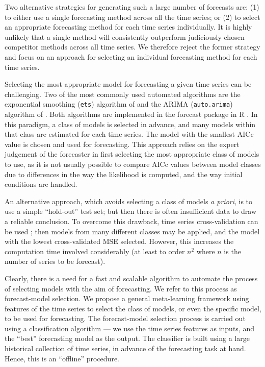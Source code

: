 \documentclass[11pt,a4paper,]{article}
\begin{document}
Two alternative strategies for generating such a large number of forecasts are: (1) to either use a single forecasting method across all the time series; or (2) to select an appropriate forecasting method for each time series individually. It is highly unlikely that a single method will consistently outperform judiciously chosen competitor methods across all time series. We therefore reject the former strategy and focus on an approach for selecting an individual forecasting method for each time series.

Selecting the most appropriate model for forecasting a given time series can be challenging. Two of the most commonly used automated algorithms are the exponential smoothing (\texttt{ets}) algorithm of \textcite{Hyndman2002} and the ARIMA (\texttt{auto.arima}) algorithm of \textcite{Hyndman2008}. Both algorithms are implemented in the forecast package in R \autocites{Rcore}{forecast}. In this paradigm, a class of models is selected in advance, and many models within that class are estimated for each time series. The model with the smallest AICc value is chosen and used for forecasting. This approach relies on the expert judgement of the forecaster in first selecting the most appropriate class of models to use, as it is not usually possible to compare AICc values between model classes due to differences in the way the likelihood is computed, and the way initial conditions are handled.

An alternative approach, which avoids selecting a class of models \emph{a priori}, is to use a simple ``hold-out'' test set; but then there is often insufficient data to draw a reliable conclusion. To overcome this drawback, time series cross-validation can be used \autocites{racine2000consistent}{hyndman2014forecasting}; then models from many different classes may be applied, and the model with the lowest cross-validated MSE selected. However, this increases the computation time involved considerably (at least to order \(n^2\) where \(n\) is the number of series to be forecast).

Clearly, there is a need for a fast and scalable algorithm to automate the process of selecting models with the aim of forecasting. We refer to this process as forecast-model selection. We propose a general meta-learning framework using features of the time series to select the class of models, or even the specific model, to be used for forecasting. The forecast-model selection process is carried out using a classification algorithm --- we use the time series features as inputs, and the ``best'' forecasting model as the output. The classifier is built using a large historical collection of time series, in advance of the forecasting task at hand. Hence, this is an ``offline'' procedure.
\end{document}
